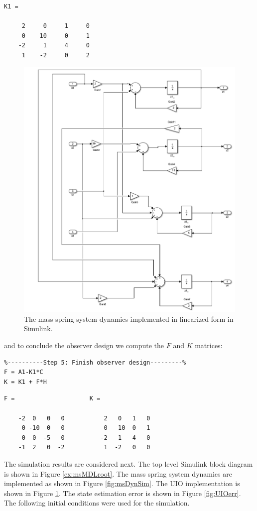 \documentclass{amsart}
\theoremstyle{definition}
\theoremstyle{remark}
\numberwithin{equation}{section}
\begin{document}
        \color{lightgray} \begin{verbatim}
K1 =

     2     0     1     0
     0    10     0     1
    -2     1     4     0
     1    -2     0     2

\end{verbatim} \color{black}

\begin{figure}[H]
    \centering
    \includegraphics[scale=.5]{msUIO.png}
    \caption{The mass spring system dynamics implemented in linearized form in Simulink.}
    \label{fig:msUIO}
\end{figure}

and to conclude the observer design we compute the $F$ and $K$ matrices:
    \begin{verbatim}
%----------Step 5: Finish observer design---------%
F = A1-K1*C
K = K1 + F*H
\end{verbatim}

        \color{lightgray} \begin{verbatim}
F =                     K =

    -2  0   0   0           2   0   1   0
     0 -10  0   0           0   10  0   1
     0  0  -5   0          -2   1   4   0
    -1  2   0  -2           1  -2   0   0
\end{verbatim} \color{black}
The simulation results are considered next.  The top level Simulink block diagram is shown in Figure \ref{ex:msMDLroot}.  The mass spring system dynamics are implemented as shown in Figure \ref{fig:msDynSim}. The UIO implementation is shown in Figure \ref{fig:msUIO}. The state estimation error is shown in Figure \ref{fig:UIOerr}. The following initial conditions were used for the simulation.
\end{document}

